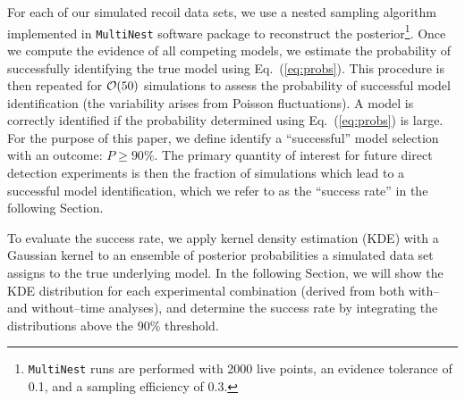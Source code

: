 \documentclass[11pt]{article}
\newcommand{\Eq}[1]{Eq.~(\ref{#1})} \newcommand{\Eqs}[2]{Eqs.~(\ref{#1}) and (\ref{#2})} \newcommand{\Eqm}[2]{Eqs.~(\ref{#1}) through (\ref{#2})}
\begin{document}
For each of our simulated recoil data sets, we use a nested sampling algorithm implemented in \texttt{MultiNest} software package \cite{pymultinest,Feroz:2008xx,Feroz:2007kg,Feroz:2013hea} to reconstruct the posterior\footnote{\texttt{MultiNest} runs are performed with 2000 live points, an evidence tolerance of 0.1, and a sampling efficiency of 0.3.}. Once we compute the evidence of all competing models, we estimate the probability of successfully identifying the true model using \Eq{eq:probs}. This procedure is then repeated for ${\cal O}(50)$ simulations to assess the probability of successful model identification (the variability arises from Poisson fluctuations). A model is correctly identified if the probability determined using \Eq{eq:probs} is large. For the purpose of this paper, we define identify a ``successful'' model selection with an outcome: $P \geq 90\%$. The primary quantity of interest for future direct detection experiments is then the fraction of simulations which lead to a successful model identification, which we refer to as the ``success rate'' in the following Section.    

To evaluate the success rate, we apply kernel density estimation (KDE) with a Gaussian kernel to an ensemble of posterior probabilities a simulated data set assigns to the true underlying model. In the following Section, we will show the KDE distribution for each experimental combination (derived from both with-- and without--time analyses), and determine the success rate by integrating the distributions above the 90\% threshold. 
\end{document}
